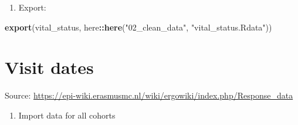 \documentclass[]{book}
\newenvironment{Shaded}{\begin{snugshade}}{\end{snugshade}}
\newcommand{\KeywordTok}[1]{\textcolor[rgb]{0.13,0.29,0.53}{\textbf{#1}}}
\newcommand{\NormalTok}[1]{#1}
\newcommand{\OperatorTok}[1]{\textcolor[rgb]{0.81,0.36,0.00}{\textbf{#1}}}
\newcommand{\StringTok}[1]{\textcolor[rgb]{0.31,0.60,0.02}{#1}}
\providecommand{\tightlist}{%
  \setlength{\itemsep}{0pt}\setlength{\parskip}{0pt}}
\begin{document}
\begin{enumerate}
\def\labelenumi{\arabic{enumi}.}
\setcounter{enumi}{2}
\tightlist
\item
  Export:
\end{enumerate}

\begin{Shaded}
\begin{Highlighting}[]
\KeywordTok{export}\NormalTok{(vital_status, here}\OperatorTok{::}\KeywordTok{here}\NormalTok{(}\StringTok{"02_clean_data"}\NormalTok{, }\StringTok{"vital_status.Rdata"}\NormalTok{))}
\end{Highlighting}
\end{Shaded}

\hypertarget{visit}{%
\chapter{Visit dates}\label{visit}}

Source: \url{https://epi-wiki.erasmusmc.nl/wiki/ergowiki/index.php/Response_data}

\begin{enumerate}
\def\labelenumi{\arabic{enumi}.}
\tightlist
\item
  Import data for all cohorts
\end{enumerate}
\end{document}
